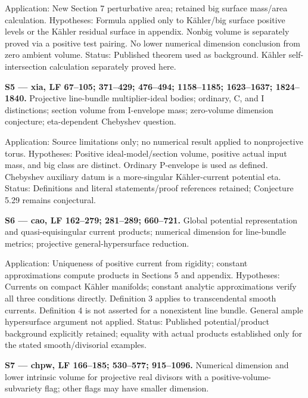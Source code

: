 \documentclass[11pt]{article}
\begin{document}
Application: New Section 7 perturbative area; retained big surface mass/\allowbreak{}area calculation. Hypotheses: Formula applied only to Kähler/\allowbreak{}big surface positive levels or the Kähler residual surface in appendix. Nonbig volume is separately proved via a positive test pairing. No lower numerical dimension conclusion from zero ambient volume. Status: Published theorem used as background. Kähler self-\allowbreak{}intersection calculation separately proved here.

\textbf{S5 — xia, LF 67–105; 371–429; 476–494; 1158–1185; 1623–1637; 1824–1840.} Projective line-\allowbreak{}bundle multiplier-\allowbreak{}ideal bodies; ordinary, C, and I distinctions; section volume from I-\allowbreak{}envelope mass; zero-\allowbreak{}volume dimension conjecture; eta-\allowbreak{}dependent Chebyshev question.

Application: Source limitations only; no numerical result applied to nonprojective torus. Hypotheses: Positive ideal-\allowbreak{}model/\allowbreak{}section volume, positive actual input mass, and big class are distinct. Ordinary P-\allowbreak{}envelope is used as defined. Chebyshev auxiliary datum is a more-\allowbreak{}singular Kähler-\allowbreak{}current potential eta. Status: Definitions and literal statements/\allowbreak{}proof references retained; Conjecture 5.29 remains conjectural.

\textbf{S6 — cao, LF 162–279; 281–289; 660–721.} Global potential representation and quasi-\allowbreak{}equisingular current products; numerical dimension for line-\allowbreak{}bundle metrics; projective general-\allowbreak{}hypersurface reduction.

Application: Uniqueness of positive current from rigidity; constant approximations compute products in Sections 5 and appendix. Hypotheses: Currents on compact Kähler manifolds; constant analytic approximations verify all three conditions directly. Definition 3 applies to transcendental smooth currents. Definition 4 is not asserted for a nonexistent line bundle. General ample hypersurface argument not applied. Status: Published potential/\allowbreak{}product background explicitly retained; equality with actual products established only for the stated smooth/\allowbreak{}divisorial examples.

\textbf{S7 — chpw, LF 166–185; 530–577; 915–1096.} Numerical dimension and lower intrinsic volume for projective real divisors with a positive-\allowbreak{}volume-\allowbreak{}subvariety flag; other flags may have smaller dimension.
\end{document}
